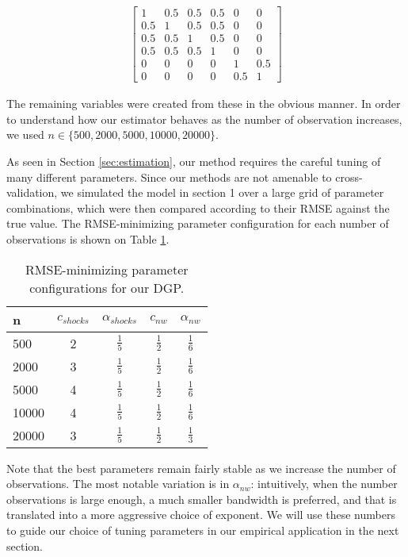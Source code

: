 \begin{align}  \label{eq:simulation_correlation}
  \begin{bmatrix}
      1&  0.5& 0.5&  0.5&  0&  0 \\
      0.5&  1& 0.5&  0.5&  0&  0 \\
      0.5& 0.5&  1&  0.5&  0&  0 \\
      0.5& 0.5& 0.5&   1&  0&  0 \\
      0&   0&  0&   0&  1& 0.5 \\
      0&   0&  0&   0& 0.5&  1
  \end{bmatrix}  
\end{align}

The remaining variables were created from these in the obvious manner. In order to understand how our estimator behaves as the number of observation increases, we used $n \in \{500, 2000, 5000, 10000, 20000 \}$.

As seen in Section \ref{sec:estimation}, our method requires the careful tuning of many different parameters. Since our methods are not amenable to cross-validation, we simulated the model in section 1 over a large grid of parameter combinations, which were then compared according to their RMSE against the true value. The RMSE-minimizing parameter configuration for each number of observations is shown on Table \ref{tab:best_parameters}.

\begin{table}[htdp]
  \centering
  \renewcommand{\arraystretch}{1.6}
  \begin{tabular}{l|cccc}
    n & $c_{shocks}$ & $\alpha_{shocks}$ & $c_{nw}$ & $\alpha_{nw}$ \\  \hline
    500 & 2 & $\frac{1}{5}$ & $\frac{1}{2}$ & $\frac{1}{6}$ \\
    2000 & 3 & $\frac{1}{5}$ & $\frac{1}{2}$ & $\frac{1}{6}$ \\
    5000 & 4 & $\frac{1}{5}$ & $\frac{1}{2}$ & $\frac{1}{6}$ \\
    10000 & 4 & $\frac{1}{5}$ & $\frac{1}{2}$ & $\frac{1}{6}$ \\
    20000 & 3 & $\frac{1}{5}$ & $\frac{1}{2}$ & $\frac{1}{3}$ \\
  \end{tabular}
  \caption{RMSE-minimizing parameter configurations for our DGP.}
  \label{tab:best_parameters}
\end{table}
 
Note that the best parameters remain fairly stable as we increase the number of observations. The most notable variation is in $\alpha_{nw}$: intuitively, when the number observations is large enough, a much smaller bandwidth is preferred, and that is translated into a more aggressive choice of exponent. We will use these numbers to guide our choice of tuning parameters in our empirical application in the next section.

